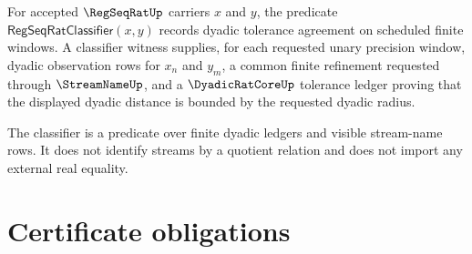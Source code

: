 \begin{definition}
\label{def:regseqrat-classifier}
For accepted $\RegSeqRatUp$ carriers $x$ and $y$, the predicate $\mathsf{RegSeqRatClassifier}(x,y)$ records dyadic tolerance agreement on scheduled finite windows. A classifier witness supplies, for each requested unary precision window, dyadic observation rows for $x_n$ and $y_m$, a common finite refinement requested through $\StreamNameUp$, and a $\DyadicRatCoreUp$ tolerance ledger proving that the displayed dyadic distance is bounded by the requested dyadic radius.

The classifier is a predicate over finite dyadic ledgers and visible stream-name rows. It does not identify streams by a quotient relation and does not import any external real equality.
\end{definition}

\section{Certificate obligations}
\label{sec:regseqrat-certificate-obligations}

